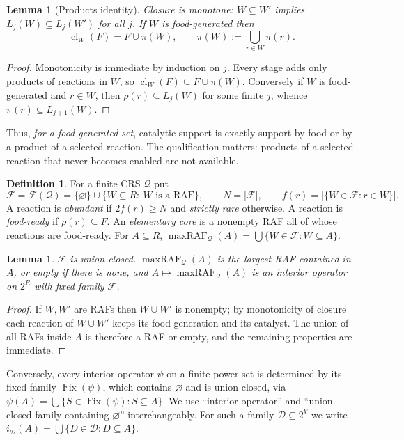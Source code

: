 \documentclass[11pt,a4paper]{article}
\theoremstyle{plain}
\newtheorem{lemma}[theorem]{Lemma}
\theoremstyle{definition}
\newtheorem{definition}[theorem]{Definition}
\theoremstyle{remark}
\newcommand{\FF}{\mathcal F}
\newcommand{\DD}{\mathcal D}
\newcommand{\QQ}{\mathcal Q}
\newcommand{\cl}{\operatorname{cl}}
\newcommand{\mraf}{\operatorname{maxRAF}}
\DeclareMathOperator{\Fix}{Fix}
\begin{document}
\begin{lemma}[Products identity]\label{lem:products}
Closure is monotone: $W\subseteq W'$ implies $L_j(W)\subseteq L_j(W')$ for all $j$.
If $W$ is food-generated then
\begin{equation}\label{eq:products}
\cl_W(F)=F\cup\pi(W),\qquad \pi(W):=\bigcup_{r\in W}\pi(r).
\end{equation}
\end{lemma}
\begin{proof}
Monotonicity is immediate by induction on $j$. Every stage adds only products of
reactions in $W$, so $\cl_W(F)\subseteq F\cup\pi(W)$. Conversely if $W$ is food-generated
and $r\in W$, then $\rho(r)\subseteq L_j(W)$ for some finite $j$, whence
$\pi(r)\subseteq L_{j+1}(W)$.
\end{proof}

Thus, \emph{for a food-generated set}, catalytic support is exactly support by food or by a
product of a selected reaction. The qualification matters: products of a selected reaction
that never becomes enabled are not available.

\begin{definition}\label{def:family}
For a finite CRS $\QQ$ put
\[
\FF=\FF(\QQ)=\{\varnothing\}\cup\{W\subseteq R:\ W\text{ is a RAF}\},\qquad N=|\FF|,\qquad
f(r)=|\{W\in\FF: r\in W\}|.
\]
A reaction is \emph{abundant} if $2f(r)\ge N$ and \emph{strictly rare} otherwise.
A reaction is \emph{food-ready} if $\rho(r)\subseteq F$. An \emph{elementary core} is a
nonempty RAF all of whose reactions are food-ready. For $A\subseteq R$,
$\mraf_\QQ(A)=\bigcup\{W\in\FF:W\subseteq A\}$.
\end{definition}

\begin{lemma}\label{lem:uc}
$\FF$ is union-closed. $\mraf_\QQ(A)$ is the largest RAF contained in $A$, or empty if there
is none, and $A\mapsto\mraf_\QQ(A)$ is an interior operator on $2^R$ with fixed family $\FF$.
\end{lemma}
\begin{proof}
If $W,W'$ are RAFs then $W\cup W'$ is nonempty; by monotonicity of closure each reaction of
$W\cup W'$ keeps its food generation and its catalyst. The union of all RAFs inside $A$ is
therefore a RAF or empty, and the remaining properties are immediate.
\end{proof}

Conversely, every interior operator $\psi$ on a finite power set is determined by its fixed
family $\Fix(\psi)$, which contains $\varnothing$ and is union-closed, via
$\psi(A)=\bigcup\{S\in\Fix(\psi):S\subseteq A\}$. We use ``interior operator'' and
``union-closed family containing $\varnothing$'' interchangeably. For such a family
$\DD\subseteq2^V$ we write $i_\DD(A)=\bigcup\{D\in\DD:D\subseteq A\}$.
\end{document}
